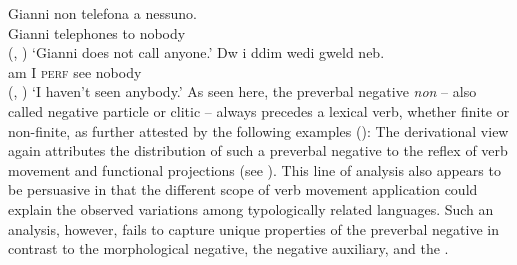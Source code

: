 \documentclass[output=paper
 	        ,biblatex
                ,babelshorthands
                ,newtxmath
                ,draftmode
                ,colorlinks, citecolor=brown
]{langscibook}
\begin{document}
\begin{exe}
\begin{xlist}
\eal
\ex \label{negation-position-1a}
\gll Gianni non telefona a nessuno.\\
     Gianni \NEG{} telephones to nobody\\ \hfill (, \citealt[]{Borsley:06})
\glt`Gianni does not call anyone.'
\ex \label{negation-position-1c}
\gll Dw i ddim wedi gweld neb.\\
     am I \NEG{} \textsc{perf} see nobody\\ \hfill  (, \citealt[]{Borsley:05})
\glt `I haven't seen anybody.'
\zl
%
%
As seen here,
the  preverbal negative \textit{non} -- also called negative particle or
clitic -- always precedes a lexical  verb, whether finite or
non-finite, as further attested by the following
examples (\citealp[Chapter~4]{Kim:00}):
%
\eal
{}
%
%
\zl
%
%
The derivational view again attributes the distribution of such
a preverbal negative to the reflex of verb movement and functional
projections (see \citealt[Chapter~1]{Belletti:90}). This line of analysis also appears to be persuasive
in that the different scope of verb movement application could explain
the observed variations among typologically related
languages. Such an analysis, however,
  fails to capture unique properties of the preverbal negative
  in contrast to the morphological negative, the negative auxiliary, and the .


\end{xlist}
\end{exe}
\end{document}
